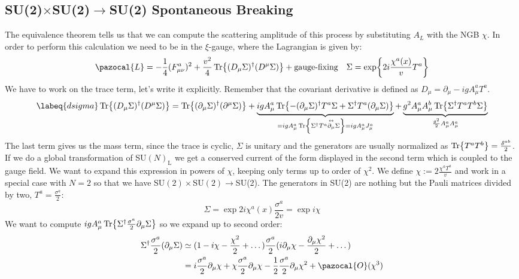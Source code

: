 \documentclass[../main.tex]{subfiles}
\begin{document}
\subsection{SU(2)$\times$SU(2)$\to$SU(2) Spontaneous Breaking}
The equivalence theorem tells us that we can compute the scattering amplitude of this process by substituting $A_L$ with the NGB $\chi$. In order to perform this calculation we need to be in the $\xi$-gauge, where the Lagrangian is given by:
\[
\pazocal{L}=-\frac{1}{4}(F_{\mu\nu}^a)^2+\frac{v^2}{4}\Tr{(D_\mu\Sigma)^\dagger(D^\mu\Sigma)}+\text{gauge-fixing} \quad \Sigma=\exp{2i\frac{\chi^a(x)}{v}T^a}
\]
We have to work on the trace term, let's write it explicitly. Remember that the covariant derivative is defined as $D_\mu=\partial_\mu-igA_\mu^aT^a$.
\begin{equation}
\labeq{dsigma}
\Tr{(D_\mu\Sigma)^\dagger(D^\mu\Sigma)}=\Tr{(\partial_\mu\Sigma)^\dagger(\partial^\mu\Sigma)}+\underbrace{igA_\mu^a\Tr{-(\partial_\mu\Sigma)^\dagger T^a\Sigma+\Sigma^\dagger T^a(\partial_\mu\Sigma)}}_{=igA_\mu^a\Tr{\Sigma^\dagger T^a\overset{\leftrightarrow}{\partial_\mu}\Sigma}=igA_\mu^aJ_\mu^a}+\underbrace{g^2A_\mu^aA_\mu^b\Tr{\Sigma^\dagger T^aT^b\Sigma}}_{\frac{g^2}{2}A_\mu^aA_\mu^a}
\end{equation}
The last term gives us the mass term, since the trace is cyclic, $\Sigma$ is unitary and the generators are usually normalized as $\Tr{T^aT^b}=\frac{\delta^{ab}}{2}$. If we do a global transformation of SU$(N)_{\text{L}}$ we get a conserved current of the form displayed in the second term which is coupled to the gauge field. We want to expand this expression in powers of $\chi$, keeping only terms up to order of $\chi^2$. We define $\chi:=2\frac{\chi^aT^a}{v}$ and work in a special case with $N=2$ so that we have SU$(2)\times$SU$(2)\to$SU(2). The generators in SU(2) are nothing but the Pauli matrices divided by two, $T^a=\frac{\sigma^a}{2}$:
\[
\Sigma=\exp{2i\chi^a(x)\frac{\sigma^a}{2v}}=\exp{i\chi}
\]
We want to compute $igA_\mu^a\Tr{\Sigma^\dagger\frac{\sigma^a}{2}\partial_\mu\Sigma}$ so we expand up to second order:
\begin{align*}
\Sigma^\dagger\frac{\sigma^a}{2}(\partial_\mu\Sigma)&\simeq(1-i\chi-\frac{\chi^2}{2}+\dots)\frac{\sigma^a}{2}(i\partial_\mu\chi-\frac{\partial_\mu\chi^2}{2}+\dots)\\
&=i\frac{\sigma^a}{2}\partial_\mu\chi+\chi\frac{\sigma^a}{2}\partial_\mu\chi-\frac{1}{2}\frac{\sigma^a}{2}\partial_\mu\chi^2+\pazocal{O}(\chi^3)
\end{align*}
\end{document}
